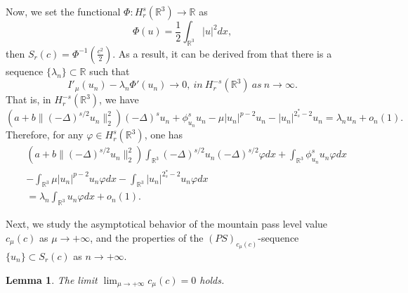 \documentclass[11pt]{article}
\numberwithin{equation}{section}
\newtheorem{lemma}[theorem]{Lemma}
\begin{document}
Now, we set the functional $\Phi:H^s_r(\mathbb{R}^3)\to \mathbb{R}$ as
$$
\Phi(u)=\frac{1}{2}\int_{\mathbb{R}^3} |u|^2dx,
$$
then $S_{r}(c)=\Phi^{-1}(\frac{c^2}{2})$. As a result, it can be derived from 
\cite[Proposition 5.12]{W6888} that there is a sequence 
$\{\lambda_n\}\subset \mathbb{R}$ such that
$$
I'_\mu(u_n)-\lambda_n \Phi'(u_n)\to 0,~in ~H^{-s}_r(\mathbb{R}^3) ~as~n\to \infty.
$$
That is, in $H^{-s}_r(\mathbb{R}^3)$, we have
\begin{equation}\label{5.16}
\left(a+b\|(-\Delta)^{s/2}u_n\|^2_2\right)(-\Delta)^s u_n+\phi^s_{u_n}u_n
-\mu |u_n|^{p-2}u_n-|u_n|^{2^*_s-2}u_n
=\lambda_n u_n+o_n(1).
\end{equation}
Therefore, for any $\varphi \in H^s_r(\mathbb{R}^3)$, one has
\begin{equation}\label{5.166}
\begin{split}
&\left(a+b\|(-\Delta)^{s/2}u_n\|^2_2\right)
\int_{\mathbb{R}^3}(-\Delta)^{s/2} u_n(-\Delta)^{s/2} \varphi dx
+\int_{\mathbb{R}^3}\phi^s_{u_n}u_n\varphi dx \\
&-\int_{\mathbb{R}^3}\mu |u_n|^{p-2}u_n\varphi dx
 -\int_{\mathbb{R}^3}|u_n|^{2^*_s-2}u_n\varphi dx \\
&=\lambda_n \int_{\mathbb{R}^3}u_n\varphi dx +o_n(1).
\end{split}
\end{equation}

Next, we study the asymptotical behavior of the mountain pass level value 
$c_\mu(c)$ as $\mu \to +\infty$, and the properties of  the $(PS)_{c_\mu(c)}$-sequence 
$\{u_n\}\subset S_{r}(c)$ as $n\to +\infty$.

\begin{lemma}\label{lem5.7} 
The limit $\lim_{\mu\to +\infty}c_\mu(c)=0 $ holds.
\end{lemma}
\end{document}
